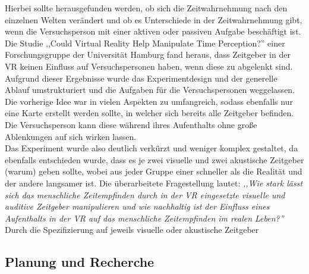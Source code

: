 \documentclass{Bericht}
\begin{document}
	 Hierbei sollte herausgefunden werden, ob sich die Zeitwahrnehmung nach den einzelnen Welten verändert und ob es Unterschiede in der Zeitwahrnehmung gibt, wenn die Versuchsperson mit einer aktiven oder passiven Aufgabe beschäftigt ist.\\
	 Die Studie ,,Could Virtual Reality Help Manipulate Time Perception?'' einer Forschungsgruppe der Universität Hamburg fand heraus, dass Zeitgeber in der VR keinen Einfluss auf Versuchspersonen haben, wenn diese zu abgelenkt sind. Aufgrund dieser Ergebnisse wurde das Experimentdesign und der generelle Ablauf umstrukturiert und die Aufgaben für die Versuchspersonen weggelassen.\\
Die vorherige Idee war in vielen Aspekten zu umfangreich, sodass ebenfalls nur eine Karte erstellt werden sollte, in welcher sich bereits alle Zeitgeber befinden. Die Versuchsperson kann diese während ihres Aufenthalts ohne große Ablenkungen auf sich wirken lassen.\\
Das Experiment wurde also deutlich verkürzt und weniger komplex gestaltet, da ebenfalls entschieden wurde, dass es je zwei visuelle und zwei akustische Zeitgeber (warum) geben sollte, wobei aus jeder Gruppe einer schneller als die Realität und der andere langsamer ist. Die überarbeitete Fragestellung lautet: \textit{,,Wie stark lässt sich das menschliche
Zeitempfinden durch in der VR eingesetzte visuelle und auditive Zeitgeber manipulieren und
wie nachhaltig ist der Einfluss eines Aufenthalts in der VR auf das menschliche Zeitempfinden
im realen Leben?''} Durch die Spezifizierung auf jeweils visuelle oder akustische Zeitgeber 	
 
	 
	
\subsection{Planung und Recherche}
\end{document}
